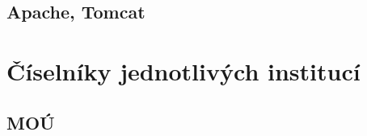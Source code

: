 \documentclass[11pt,draft,oneside]{fithesis2}
\begin{document}
\begin{appendix}
\section{Apache, Tomcat}


\chapter{Číselníky jednotlivých institucí}

\section{MOÚ}


\end{appendix}
\end{document}

